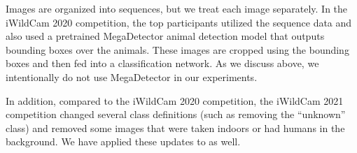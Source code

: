 Images are organized into sequences, but we treat each image separately. In the iWildCam 2020 competition, the top participants utilized the sequence data and also used a pretrained MegaDetector animal detection model that outputs bounding boxes over the animals. These images are cropped using the bounding boxes and then fed into a classification network. As we discuss above, we intentionally do not use MegaDetector in our experiments.

In addition, compared to the iWildCam 2020 competition, the iWildCam 2021 competition changed several class definitions (such as removing the ``unknown'' class) and removed some images that were taken indoors or had humans in the background. We have applied these updates to \iWildCam as well.
